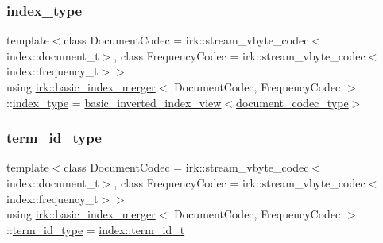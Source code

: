 \subsubsection{\texorpdfstring{index\+\_\+type}{index\_type}}
{\footnotesize\ttfamily template$<$class Document\+Codec  = irk\+::stream\+\_\+vbyte\+\_\+codec$<$index\+::document\+\_\+t$>$, class Frequency\+Codec  = irk\+::stream\+\_\+vbyte\+\_\+codec$<$index\+::frequency\+\_\+t$>$$>$ \\
using \mbox{\hyperlink{classirk_1_1basic__index__merger}{irk\+::basic\+\_\+index\+\_\+merger}}$<$ Document\+Codec, Frequency\+Codec $>$\+::\mbox{\hyperlink{classirk_1_1basic__index__merger_a76f8b8ca41e8fa63480a0d2421578259}{index\+\_\+type}} =  \mbox{\hyperlink{classirk_1_1basic__inverted__index__view}{basic\+\_\+inverted\+\_\+index\+\_\+view}}$<$\mbox{\hyperlink{classirk_1_1basic__index__merger_af331ba6d7dd6d96484c6608f4236d8f1}{document\+\_\+codec\+\_\+type}}$>$}

\mbox{\label{classirk_1_1basic__index__merger_ab264f391caf7e164305b87ede0ac0182}} 
\subsubsection{\texorpdfstring{term\+\_\+id\+\_\+type}{term\_id\_type}}
{\footnotesize\ttfamily template$<$class Document\+Codec  = irk\+::stream\+\_\+vbyte\+\_\+codec$<$index\+::document\+\_\+t$>$, class Frequency\+Codec  = irk\+::stream\+\_\+vbyte\+\_\+codec$<$index\+::frequency\+\_\+t$>$$>$ \\
using \mbox{\hyperlink{classirk_1_1basic__index__merger}{irk\+::basic\+\_\+index\+\_\+merger}}$<$ Document\+Codec, Frequency\+Codec $>$\+::\mbox{\hyperlink{classirk_1_1basic__index__merger_ab264f391caf7e164305b87ede0ac0182}{term\+\_\+id\+\_\+type}} =  \mbox{\hyperlink{namespaceirk_1_1index_ae2ce3a02969196fe6dab4443ed2007d5}{index\+::term\+\_\+id\+\_\+t}}}

\mbox{\label{classirk_1_1basic__index__merger_af5d70e8a911f2b291337d008358fd15e}} 
